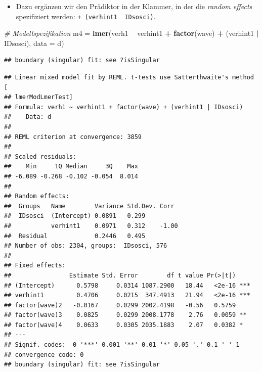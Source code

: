 \documentclass[
]{book}
\newenvironment{Shaded}{\begin{snugshade}}{\end{snugshade}}
\newcommand{\CommentTok}[1]{\textcolor[rgb]{0.56,0.35,0.01}{\textit{#1}}}
\newcommand{\DataTypeTok}[1]{\textcolor[rgb]{0.13,0.29,0.53}{#1}}
\newcommand{\KeywordTok}[1]{\textcolor[rgb]{0.13,0.29,0.53}{\textbf{#1}}}
\newcommand{\NormalTok}[1]{#1}
\newcommand{\OperatorTok}[1]{\textcolor[rgb]{0.81,0.36,0.00}{\textbf{#1}}}
\newcommand{\OtherTok}[1]{\textcolor[rgb]{0.56,0.35,0.01}{#1}}
\newcommand{\StringTok}[1]{\textcolor[rgb]{0.31,0.60,0.02}{#1}}
\providecommand{\tightlist}{%
  \setlength{\itemsep}{0pt}\setlength{\parskip}{0pt}}
\begin{document}
\begin{itemize}
  \begin{itemize}
  \tightlist
  \item
    Dazu ergänzen wir den Prädiktor in der Klammer, in der die \emph{random effects} spezifiziert werden: \texttt{+\ (verhint1\ \textbar{}\ IDsosci)}.
  \end{itemize}
\end{itemize}

\begin{Shaded}
\begin{Highlighting}[]
\CommentTok{# Modellspezifikation}
\NormalTok{m4 =}\StringTok{ }\KeywordTok{lmer}\NormalTok{(verh1 }\OperatorTok{~}\StringTok{ }\NormalTok{verhint1 }\OperatorTok{+}\StringTok{ }\KeywordTok{factor}\NormalTok{(wave) }\OperatorTok{+}\StringTok{ }\NormalTok{(verhint1 }\OperatorTok{|}\StringTok{ }\NormalTok{IDsosci), }\DataTypeTok{data =}\NormalTok{ d)}
\end{Highlighting}
\end{Shaded}

\begin{verbatim}
## boundary (singular) fit: see ?isSingular
\end{verbatim}

\begin{Shaded}
\end{Shaded}

\begin{verbatim}
## Linear mixed model fit by REML. t-tests use Satterthwaite's method [
## lmerModLmerTest]
## Formula: verh1 ~ verhint1 + factor(wave) + (verhint1 | IDsosci)
##    Data: d
## 
## REML criterion at convergence: 3859
## 
## Scaled residuals: 
##    Min     1Q Median     3Q    Max 
## -6.089 -0.268 -0.102 -0.054  8.014 
## 
## Random effects:
##  Groups   Name        Variance Std.Dev. Corr 
##  IDsosci  (Intercept) 0.0891   0.299         
##           verhint1    0.0971   0.312    -1.00
##  Residual             0.2446   0.495         
## Number of obs: 2304, groups:  IDsosci, 576
## 
## Fixed effects:
##                Estimate Std. Error        df t value Pr(>|t|)    
## (Intercept)      0.5798     0.0314 1087.2900   18.44   <2e-16 ***
## verhint1         0.4706     0.0215  347.4913   21.94   <2e-16 ***
## factor(wave)2   -0.0167     0.0299 2002.4198   -0.56   0.5759    
## factor(wave)3    0.0825     0.0299 2008.1778    2.76   0.0059 ** 
## factor(wave)4    0.0633     0.0305 2035.1883    2.07   0.0382 *  
## ---
## Signif. codes:  0 '***' 0.001 '**' 0.01 '*' 0.05 '.' 0.1 ' ' 1
## convergence code: 0
## boundary (singular) fit: see ?isSingular
\end{verbatim}
\end{document}
